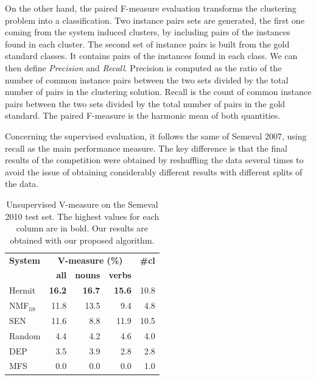 On the other hand, the paired F-measure evaluation transforms the clustering problem into a classification. Two instance pairs sets are generated, the first one coming from the system induced clusters, by including pairs of the instances found in each cluster. The second set of instance pairs is built from the gold standard classes. It contains pairs of the instances found in each class. We can then define \textit{Precision} and \textit{Recall}. Precision is computed as the ratio of the number of common instance pairs between the two sets divided by the total number of pairs in the clustering solution. Recall is the count of common instance pairs between the two sets divided by the total number of pairs in the gold standard. The paired F-measure is the harmonic mean of both quantities.

Concerning the supervised evaluation, it follows the same of Semeval 2007, using recall as the main performance measure. The key difference is that the final results of the competition were obtained by reshuffling the data several times to avoid the issue of obtaining considerably different results with different splits of the data.

\begin{table}[]
\centering
\caption{Unsupervised V-measure  on the Semeval 2010 test set. The highest values for each column are in bold. Our results are obtained with our proposed algorithm.}
\begin{tabular}{@{}lrrrr@{}}
\toprule
\textbf{System} & \multicolumn{3}{c}{\textbf{V-measure (\%)}} & \textbf{\#cl} \\
 & \textbf{all} & \textbf{nouns} & \textbf{verbs} & \\ \midrule
{Hermit} & \textbf{16.2} & \textbf{16.7} & \textbf{15.6} & 10.8 \\
NMF$_{lib}$&11.8&13.5&9.4&4.8\\
SEN & 11.6 & 8.8 & 11.9 & 10.5 \\
Random & 4.4 & 4.2 & 4.6 & 4.0 \\
DEP & 3.5 & 3.9 & 2.8 & 2.8 \\
MFS & 0.0 & 0.0 & 0.0 & 1.0 \\ \bottomrule
\end{tabular}

\label{tab:sem2010_VM}
\end{table}

